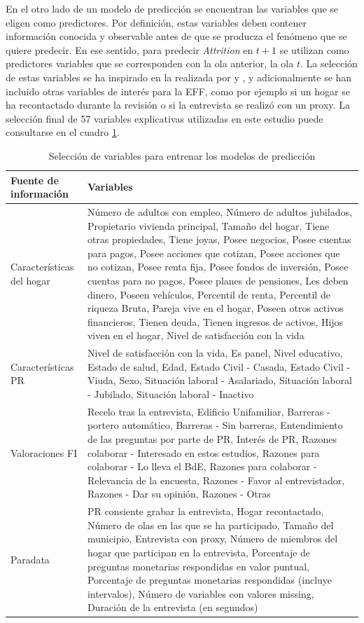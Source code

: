 En el otro lado de un modelo de predicción se encuentran las variables que se eligen como predictores. Por definición, estas variables deben contener información conocida y observable antes de que se producza el fenómeno que se quiere predecir. En ese sentido, para predecir \textit{Attrition} en $t+1$ se utilizan como predictores variables que se corresponden con la ola anterior, la ola $t$. La selección de estas variables se ha inspirado en la realizada por \cite{beste2023case} y \cite{kern2021predicting}, y adicionalmente se han incluido otras variables de interés para la EFF, como por ejemplo si un hogar se ha recontactado durante la revisión o si la entrevista se realizó con un proxy. La selección final de 57 variables explicativas utilizadas en este estudio puede consultarse en el cuadro \ref{table:vars}.

\begin{table}[ht]
    \centering
    \begin{tabular}{|l|p{10cm}|}
    \hline
        \textbf{Fuente de información} & \textbf{Variables} \\ \hline
        Características del hogar & Número de adultos con empleo, Número de adultos jubilados, Propietario vivienda principal, Tamaño del hogar, Tiene otras propiedades, Tiene joyas, Posee negocios, Posee cuentas para pagos, Posee acciones que cotizan, Posee acciones que no cotizan, Posee renta fija, Posee fondos de inversión, Posee cuentas para no pagos, Posee planes de pensiones, Les deben dinero, Poseen vehículos, Percentil de renta, Percentil de riqueza Bruta, Pareja vive en el hogar, Poseen otros activos financieros, Tienen deuda, Tienen ingresos de activos, Hijos viven en el hogar, Nivel de satisfacción con la vida \\ \hline
        Características PR & Nivel de satisfacción con la vida, Es panel, Nivel educativo, Estado de salud, Edad, Estado Civil - Casada, Estado Civil - Viuda, Sexo, Situación laboral - Asalariado, Situación laboral - Jubilado, Situación laboral - Inactivo \\ \hline
        Valoraciones FI & Recelo tras la entrevista, Edificio Unifamiliar, Barreras - portero automático, Barreras - Sin barreras, Entendimiento de las preguntas por parte de PR, Interés de PR, Razones colaborar - Interesado en estos estudios, Razones para colaborar - Lo lleva el BdE, Razones para colaborar - Relevancia de la encuesta, Razones - Favor al entrevistador, Razones - Dar su opinión, Razones - Otras \\ \hline
        Paradata & PR consiente grabar la entrevista, Hogar recontactado, Número de olas en las que se ha participado, Tamaño del municipio, Entrevista con proxy, Número de miembros del hogar que participan en la entrevista, Porcentaje de preguntas monetarias respondidas en valor puntual, Porcentaje de preguntas monetarias respondidas (incluye intervalos), Número de variables con valores missing, Duración de la entrevista (en segundos) \\ \hline
    \end{tabular}
    \caption{Selección de variables para entrenar los modelos de predicción}
    \label{table:vars}
\end{table}

